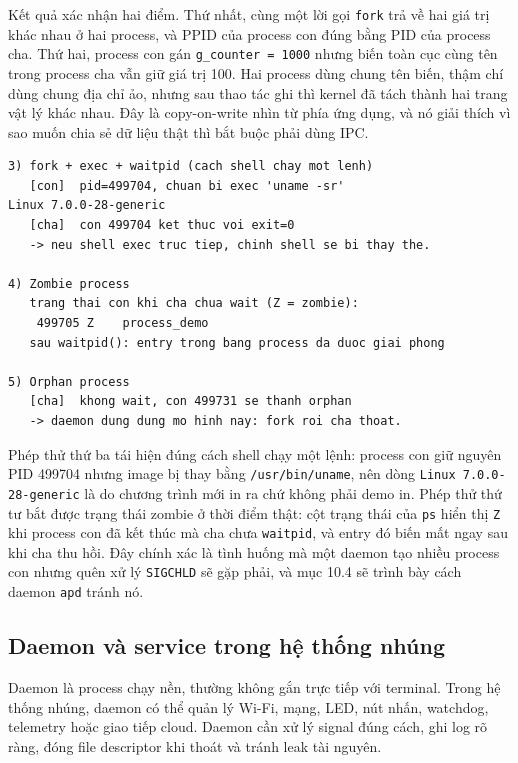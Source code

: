 \documentclass[11pt]{article}
\newcommand{\code}[1]{\texttt{#1}}
\begin{document}
Kết quả xác nhận hai điểm. Thứ nhất, cùng một lời gọi \code{fork} trả về hai giá trị khác nhau ở hai process, và PPID của process con đúng bằng PID của process cha. Thứ hai, process con gán \code{g\_counter = 1000} nhưng biến toàn cục cùng tên trong process cha vẫn giữ giá trị 100. Hai process dùng chung tên biến, thậm chí dùng chung địa chỉ ảo, nhưng sau thao tác ghi thì kernel đã tách thành hai trang vật lý khác nhau. Đây là copy-on-write nhìn từ phía ứng dụng, và nó giải thích vì sao muốn chia sẻ dữ liệu thật thì bắt buộc phải dùng IPC.

\begin{lstlisting}[caption={fork + exec + waitpid, zombie và orphan}]
3) fork + exec + waitpid (cach shell chay mot lenh)
   [con]  pid=499704, chuan bi exec 'uname -sr'
Linux 7.0.0-28-generic
   [cha]  con 499704 ket thuc voi exit=0
   -> neu shell exec truc tiep, chinh shell se bi thay the.

4) Zombie process
   trang thai con khi cha chua wait (Z = zombie):
    499705 Z    process_demo
   sau waitpid(): entry trong bang process da duoc giai phong

5) Orphan process
   [cha]  khong wait, con 499731 se thanh orphan
   -> daemon dung dung mo hinh nay: fork roi cha thoat.
\end{lstlisting}

Phép thử thứ ba tái hiện đúng cách shell chạy một lệnh: process con giữ nguyên PID 499704 nhưng image bị thay bằng \code{/usr/bin/uname}, nên dòng \code{Linux 7.0.0-28-generic} là do chương trình mới in ra chứ không phải demo in. Phép thử thứ tư bắt được trạng thái zombie ở thời điểm thật: cột trạng thái của \code{ps} hiển thị \code{Z} khi process con đã kết thúc mà cha chưa \code{waitpid}, và entry đó biến mất ngay sau khi cha thu hồi. Đây chính xác là tình huống mà một daemon tạo nhiều process con nhưng quên xử lý \code{SIGCHLD} sẽ gặp phải, và mục 10.4 sẽ trình bày cách daemon \code{apd} tránh nó.

\subsection{Daemon và service trong hệ thống nhúng}

Daemon là process chạy nền, thường không gắn trực tiếp với terminal. Trong hệ thống nhúng, daemon có thể quản lý Wi-Fi, mạng, LED, nút nhấn, watchdog, telemetry hoặc giao tiếp cloud. Daemon cần xử lý signal đúng cách, ghi log rõ ràng, đóng file descriptor khi thoát và tránh leak tài nguyên.
\end{document}
